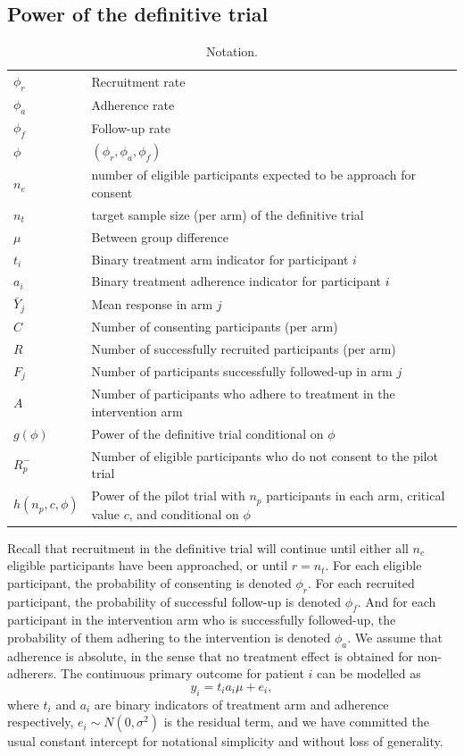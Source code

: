 \documentclass[AMA,STIX1COL]{WileyNJD-v2}
\begin{document}
\subsection{Power of the definitive trial}\label{sec:power}

\begin{table}
\centering
\caption{Notation.}
\begin{tabular}{l p{8cm}}
\toprule
$\phi_r$ & Recruitment rate \\
$\phi_a$ & Adherence rate \\
$\phi_f$ & Follow-up rate \\
$\phi$ & $(\phi_r, \phi_a, \phi_f)$ \\
$n_e$ & number of eligible participants expected to be approach for consent \\
$n_t$ & target sample size (per arm) of the definitive trial \\
$\mu$ & Between group difference \\
$t_i$ & Binary treatment arm indicator for participant $i$ \\
$a_i$ & Binary treatment adherence indicator for participant $i$ \\
$\bar{Y}_j$ & Mean response in arm $j$ \\
$C$ & Number of consenting participants (per arm) \\
$R$ & Number of successfully recruited participants (per arm) \\
$F_j$ & Number of participants successfully followed-up in arm $j$ \\
$A$ & Number of participants who adhere to treatment in the intervention arm \\
$g(\phi)$ & Power of the definitive trial conditional on $\phi$ \\
$R_p^-$ & Number of eligible participants who do not consent to the pilot trial \\
$h(n_p, c, \phi)$ & Power of the pilot trial with $n_p$ participants in each arm, critical value $c$, and conditional on $\phi$ \\
\bottomrule
\end{tabular}
\end{table}

Recall that recruitment in the definitive trial will continue until either all $n_e$ eligible participants have been approached, or until $r = n_t$. For each eligible participant, the probability of consenting is denoted $\phi_r$. For each recruited participant, the probability of successful follow-up is denoted $\phi_f$. And for each participant in the intervention arm who is successfully followed-up, the probability of them adhering to the intervention is denoted $\phi_a$. We assume that adherence is absolute, in the sense that no treatment effect is obtained for non-adherers. The continuous primary outcome for patient $i$ can be modelled as
$$
y_i = t_i a_i \mu + e_i,
$$
where $t_i$ and $a_i$ are binary indicators of treatment arm and adherence respectively, $e_i \sim N(0, \sigma^2)$ is the residual term, and we have committed the usual constant intercept for notational simplicity and without loss of generality.
\end{document}
